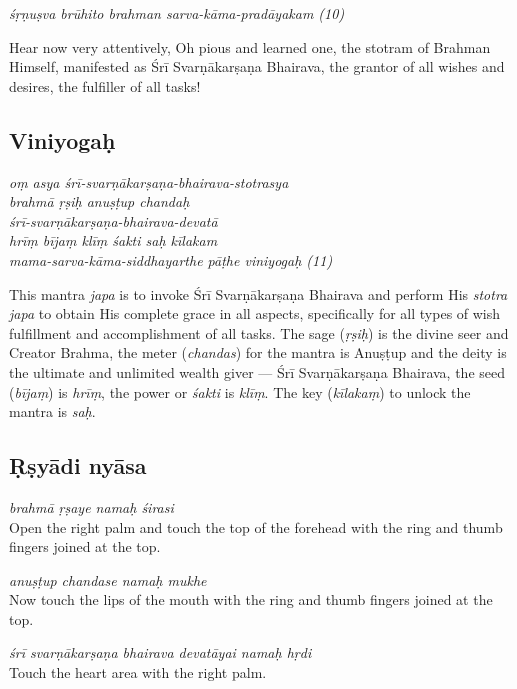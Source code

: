 \documentclass[11pt,oneside,a4paper]{article}
\newenvironment{shloka}[1]
  {\bigskip\center#1\varwidth{\linewidth}}
  {\endvarwidth\endcenter\bigskip}
\newcommand{\tl}[1]{\emph{#1}}
\begin{document}
\begin{shloka}\itshape
  śṛṇuṣva brūhito brahman sarva-kāma-pradāyakam (10)
\end{shloka}

Hear now very attentively, Oh pious and learned one, the stotram of Brahman
Himself, manifested as Śrī Svarṇākarṣaṇa Bhairava, the grantor of all wishes
and desires, the fulfiller of all tasks!

\subsection{Viniyogaḥ}

\begin{shloka}\itshape
  oṃ asya śrī-svarṇākarṣaṇa-bhairava-stotrasya\\
  brahmā ṛṣiḥ anuṣṭup chandaḥ\\
  śrī-svarṇākarṣaṇa-bhairava-devatā\\
  hrīṃ bījaṃ klīṃ śakti saḥ kīlakam\\
  mama-sarva-kāma-siddhayarthe pāṭhe viniyogaḥ (11)
\end{shloka}

This mantra \tl{japa} is to invoke Śrī Svarṇākarṣaṇa Bhairava and perform His
\tl{stotra japa} to obtain His complete grace in all aspects, specifically for
all types of wish fulfillment and accomplishment of all tasks. The sage
(\tl{ṛṣiḥ}) is the divine seer and Creator Brahma, the meter (\tl{chandas}) for
the mantra is Anuṣṭup and the deity is the ultimate and unlimited wealth giver —
Śrī Svarṇākarṣaṇa Bhairava, the seed (\tl{bījaṃ}) is \tl{hrīṃ}, the power or
\tl{śakti} is \tl{klīṃ}. The key (\tl{kīlakaṃ}) to unlock the mantra is \tl{saḥ}.

\subsection{Ṛṣyādi nyāsa}

\tl{brahmā ṛṣaye namaḥ śirasi}\\
Open the right palm and touch the top of the forehead with the ring and thumb
fingers joined at the top.

\tl{anuṣṭup chandase namaḥ mukhe}\\
Now touch the lips of the mouth with the ring and thumb fingers joined at
the top.

\tl{śrī svarṇākarṣaṇa bhairava devatāyai namaḥ hṛdi}\\
Touch the heart area with the right palm.
\end{document}
